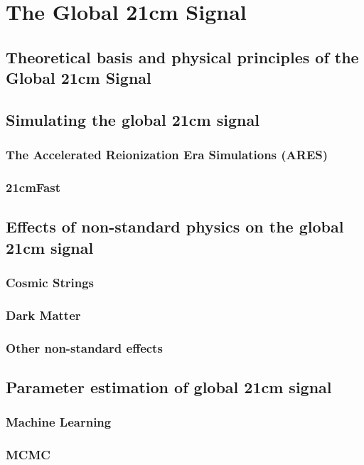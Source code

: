 \documentclass[12pt, TexShade, letterpaper]{report}
\begin{document}
\chapter{The Global 21cm Signal}
\label{chap:global21cm}
\section{Theoretical basis and physical principles of the Global 21cm Signal}
\section{Simulating the global 21cm signal}
\subsection{The Accelerated Reionization Era Simulations (ARES)}
\subsection{21cmFast}
\section{Effects of non-standard physics on the global 21cm signal}
\label{chap:global21cm,sub:non_standard}
\subsection{Cosmic Strings}
\subsection{Dark Matter}
\subsection{Other non-standard effects}
\section{Parameter estimation of global 21cm signal}
\label{chap:global21cm,sub:parameter_estimation}
\subsection{Machine Learning}
\subsection{MCMC}
\end{document}
